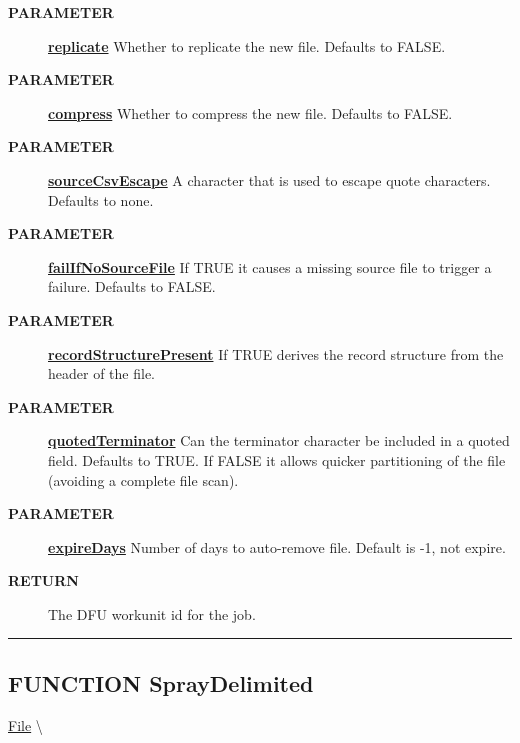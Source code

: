 \begin{description}
\item [\colorbox{tagtype}{\color{white} \textbf{\textsf{PARAMETER}}}] \textbf{\underline{replicate}} Whether to replicate the new file. Defaults to FALSE.
\item [\colorbox{tagtype}{\color{white} \textbf{\textsf{PARAMETER}}}] \textbf{\underline{compress}} Whether to compress the new file. Defaults to FALSE.
\item [\colorbox{tagtype}{\color{white} \textbf{\textsf{PARAMETER}}}] \textbf{\underline{sourceCsvEscape}} A character that is used to escape quote characters. Defaults to none.
\item [\colorbox{tagtype}{\color{white} \textbf{\textsf{PARAMETER}}}] \textbf{\underline{failIfNoSourceFile}} If TRUE it causes a missing source file to trigger a failure. Defaults to FALSE.
\item [\colorbox{tagtype}{\color{white} \textbf{\textsf{PARAMETER}}}] \textbf{\underline{recordStructurePresent}} If TRUE derives the record structure from the header of the file.
\item [\colorbox{tagtype}{\color{white} \textbf{\textsf{PARAMETER}}}] \textbf{\underline{quotedTerminator}} Can the terminator character be included in a quoted field. Defaults to TRUE. If FALSE it allows quicker partitioning of the file (avoiding a complete file scan).
\item [\colorbox{tagtype}{\color{white} \textbf{\textsf{PARAMETER}}}] \textbf{\underline{expireDays}} Number of days to auto-remove file. Default is -1, not expire.
\item [\colorbox{tagtype}{\color{white} \textbf{\textsf{RETURN}}}] \textbf{\underline{}} The DFU workunit id for the job.
\end{description}

\rule{\linewidth}{0.5pt}
\subsection*{\textsf{\colorbox{headtoc}{\color{white} FUNCTION}
SprayDelimited}}

\hypertarget{ecldoc:file.spraydelimited}{}
\hspace{0pt} \hyperlink{ecldoc:File}{File} \textbackslash 

